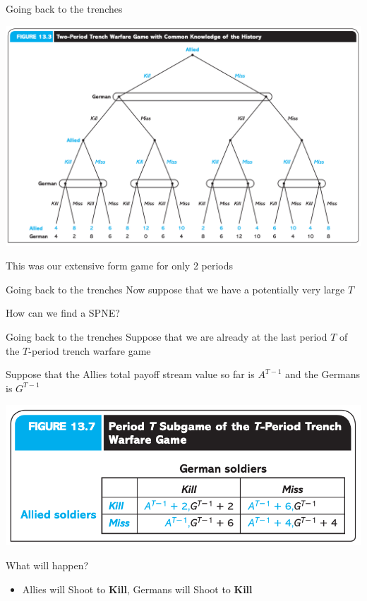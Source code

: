 \begin{frame}{Going back to the trenches}
  \begin{center}
    \includegraphics[width=.8\textwidth]{figures/fig133.png} 
  \end{center}  
  This was our extensive form game for only 2 periods
\end{frame}

\begin{frame}{Going back to the trenches}
  Now suppose that we have a potentially very large $T$

  How can we find a SPNE?

\end{frame}

\begin{frame}{Going back to the trenches}
  Suppose that we are already at the last period $T$ of the $T$-period trench warfare game 

  Suppose that the Allies total payoff stream value so far is $A^{T-1}$ and the Germans is $G^{T-1}$ 
  \begin{center}
    \includegraphics[width=.7\textwidth]{figures/tab137.png} 
  \end{center}
  What will happen?
  \pause

  \begin{itemize}
      \item Allies will Shoot to \textbf{Kill},
      Germans will Shoot to \textbf{Kill}
  \end{itemize}
\end{frame}

